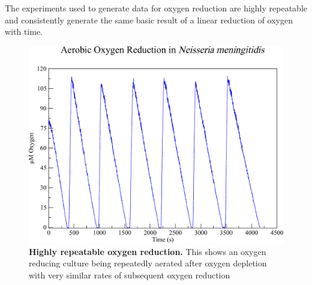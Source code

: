 The experiments used to generate data for oxygen reduction are highly repeatable and consistently generate the same basic result of a linear reduction of oxygen with time.
\begin{figure}[t]
 \centering
 \includegraphics[width=13cm, clip=true]{./05-oxygenreduction/data/repeatable_o2.pdf}
 \caption[Highly repeatable oxygen reduction]{{\bf Highly repeatable oxygen reduction.} This shows an oxygen reducing culture being repeatedly aerated after oxygen depletion with very similar rates of subsequent oxygen reduction
 \label{fig:oxy_repeatable_chl}}
\end{figure}

